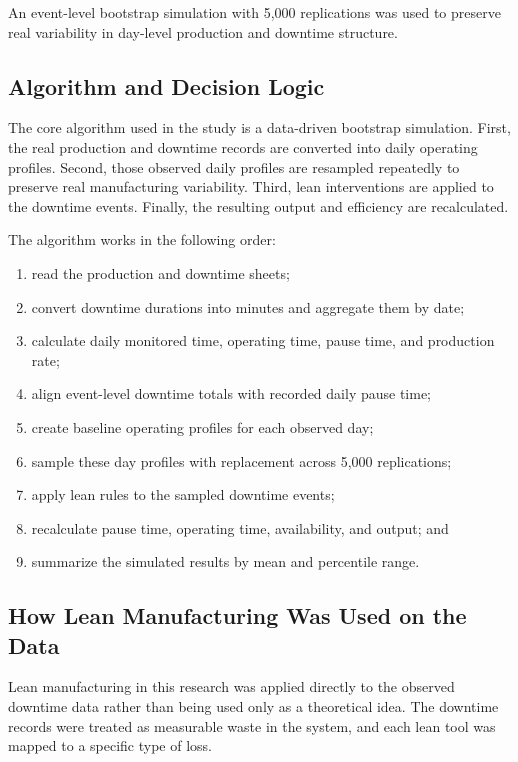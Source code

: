 \documentclass[12pt,a4paper]{article}
\begin{document}
An event-level bootstrap simulation with 5,000 replications was used to preserve real variability in day-level production and downtime structure.

\subsection{Algorithm and Decision Logic}
The core algorithm used in the study is a data-driven bootstrap simulation. First, the real production and downtime records are converted into daily operating profiles. Second, those observed daily profiles are resampled repeatedly to preserve real manufacturing variability. Third, lean interventions are applied to the downtime events. Finally, the resulting output and efficiency are recalculated.

The algorithm works in the following order:
\begin{enumerate}
    \item read the production and downtime sheets;
    \item convert downtime durations into minutes and aggregate them by date;
    \item calculate daily monitored time, operating time, pause time, and production rate;
    \item align event-level downtime totals with recorded daily pause time;
    \item create baseline operating profiles for each observed day;
    \item sample these day profiles with replacement across 5,000 replications;
    \item apply lean rules to the sampled downtime events;
    \item recalculate pause time, operating time, availability, and output; and
    \item summarize the simulated results by mean and percentile range.
\end{enumerate}

\subsection{How Lean Manufacturing Was Used on the Data}
Lean manufacturing in this research was applied directly to the observed downtime data rather than being used only as a theoretical idea. The downtime records were treated as measurable waste in the system, and each lean tool was mapped to a specific type of loss.
\end{document}
